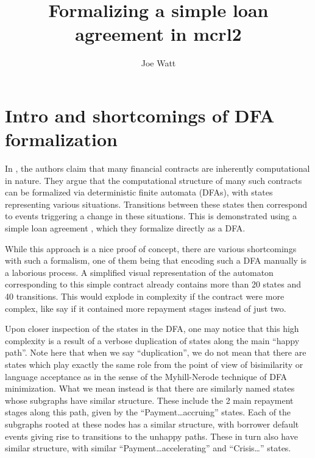\documentclass{article}
\title{Formalizing a simple loan agreement in mcrl2}
\author{Joe Watt}
\begin{document}
\maketitle


\tableofcontents

\section{Intro and shortcomings of DFA formalization}


In \cite{contract_as_automaton}, the authors claim that many financial
contracts are inherently computational in nature.
They argue that the computational structure of many such contracts
can be formalized via deterministic finite automata (DFAs), with states
representing various situations.
Transitions between these states then correspond to events triggering a change
in these situations.
This is demonstrated using a simple loan agreement
\cite[Table 1]{contract_as_automaton}, which they formalize
directly as a DFA.

While this approach is a nice proof of concept, there are various shortcomings
with such a formalism, one of them being that encoding such a DFA manually
is a laborious process.
A simplified visual representation of the automaton corresponding to this
simple contract \cite[Fig. 1]{contract_as_automaton} already contains more than
20 states and 40 transitions.
This would explode in complexity if the contract were more complex, like say if
it contained more repayment stages instead of just two.

Upon closer inspection of the states in the DFA, one may notice that this
high complexity is a result of a verbose duplication of states along the main
``happy path''.
Note here that when we say ``duplication'', we do not mean that there are states
which play exactly the same role from the point of view of bisimilarity or
language acceptance as in the sense of the Myhill-Nerode technique of DFA
minimization.
What we mean instead is that there are similarly named states whose subgraphs
have similar structure.
These include the 2 main repayment stages along this path, given by the
``Payment\dots accruing'' states.
Each of the subgraphs rooted at these nodes has a similar structure, with
borrower default events giving rise to transitions to the unhappy paths.
These in turn also have similar structure, with similar
``Payment\dots accelerating'' and ``Crisis\dots'' states.
\end{document}
